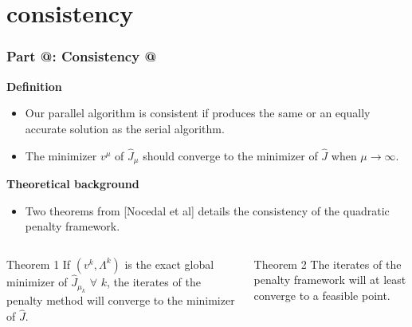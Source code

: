 \documentclass[9pt]{beamer}
\makeatletter
\newcommand*{\rom}[1]{\expandafter\@slowromancap\romannumeral #1@}
\makeatother
\begin{document}
\section{consistency}
\begin{frame}
\frametitle{\textbf{ Part \rom{4}:} Consistency \rom{1}}
\textbf{Definition}
\begin{itemize}
\item{Our parallel algorithm is consistent if produces the same or an equally accurate solution as the serial algorithm.}
\item{The minimizer $v^{\mu}$ of $\hat J_{\mu}$ should converge to the minimizer of $\hat J$ when $\mu\rightarrow \infty$.}
\end{itemize}
\textbf{Theoretical background}
\begin{itemize}
\item{Two theorems from [Nocedal et al] details the consistency of the quadratic penalty framework.}
\end{itemize}
\begin{columns}
\begin{block}{Theorem 1}
If $(v^k,\Lambda^k)$ is the exact global minimizer of $\hat J_{\mu_{k}}$ $\forall$ $k$, the iterates of the penalty method will converge to the minimizer of $\hat J$.
\end{block}
\begin{block}{Theorem 2}
The iterates of the penalty framework will at least converge to a feasible point.
\end{block}
\end{columns}
\end{frame}
\end{document}
